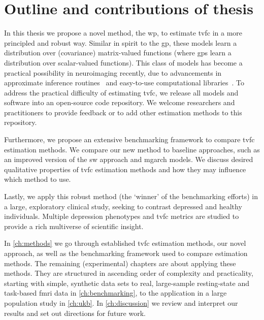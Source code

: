 \clearpage
\section{Outline and contributions of thesis}

In this thesis we propose a novel method, the \gls{wp}, to estimate \gls{tvfc} in a more principled and robust way.
Similar in spirit to the \gls{gp}, these models learn a distribution over (covariance) matrix-valued functions (where \glspl{gp} learn a distribution over scalar-valued functions).
This class of models has become a practical possibility in neuroimaging recently, due to advancements in approximate inference routines~\parencite{Heaukulani2019} and easy-to-use computational libraries~\parencite{Matthews2017}.
To address the practical difficulty of estimating \gls{tvfc}, we release all models and software into an open-source code repository.
We welcome researchers and practitioners to provide feedback or to add other estimation methods to this repository.

Furthermore, we propose an extensive benchmarking framework to compare \gls{tvfc} estimation methods.
We compare our new method to baseline approaches, such as an improved version of the \gls{sw} approach and \gls{mgarch} models.
We discuss desired qualitative properties of \gls{tvfc} estimation methods and how they may influence which method to use.

Lastly, we apply this robust method (the `winner' of the benchmarking efforts) in a large, exploratory clinical study, seeking to contrast depressed and healthy individuals.
Multiple depression phenotypes and \gls{tvfc} metrics are studied to provide a rich multiverse of scientific insight.

In \cref{ch:methods} we go through established \gls{tvfc} estimation methods, our novel approach, as well as the benchmarking framework used to compare estimation methods.
The remaining (experimental) chapters are about applying these methods.
They are structured in ascending order of complexity and practicality, starting with simple, synthetic data sets to real, large-sample resting-state and task-based \gls{fmri} data in \cref{ch:benchmarking}, to the application in a large population study in \cref{ch:ukb}.
In \cref{ch:discussion} we review and interpret our results and set out directions for future work.

